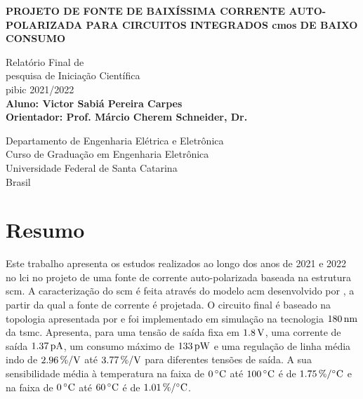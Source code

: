 \documentclass[10pt,a4paper]{extreport}
\newcommand{\?}{\stackrel{?}{=}}
\newcommand{\sis}[2]{\complexnum{#1}\,\si[per-mode=symbol]{#2}}
\newcommand\myemptypage{
    \null
    \thispagestyle{empty}
    \addtocounter{page}{-1}
    \newpage
    }
\begin{document}
\begingroup
\renewcommand{\thepage}{0}
\begin{titlepage}
    \begin{center}
        \vspace*{1cm}
        \Huge
        \textbf{PROJETO DE FONTE DE BAIXÍSSIMA CORRENTE AUTO-POLARIZADA PARA CIRCUITOS INTEGRADOS \acrshort{cmos} DE BAIXO CONSUMO}
             
        \vspace{1.5cm}

        Relatório Final de \\
        pesquisa de Iniciação Científica\\
        \acrshort{pibic} 2021/2022\\
 
        \vfill
        \Large
        \textbf{Aluno: Victor Sabiá Pereira Carpes}\\
        \textbf{Orientador: Prof. Márcio Cherem Schneider, Dr.}
        \vspace{0.8cm}

        Departamento de Engenharia Elétrica e Eletrônica\\
        Curso de Graduação em Engenharia Eletrônica\\
        Universidade Federal de Santa Catarina\\
        Brasil\\
        
             
    \end{center}
\end{titlepage}
\endgroup
\myemptypage
\Large

\setcounter{lofdepth}{2}
\tableofcontents

\chapter*{Resumo}
\label{ch:resumo}

Este trabalho apresenta os estudos realizados ao longo dos anos de 2021 e 2022 no \acrfull{lci} no projeto de uma fonte de corrente auto-polarizada baseada na estrutura \acrfull{scm}. A caracterização do \acrshort{scm} é feita através do modelo \acrfull{acm} desenvolvido por \cite{acm:book}, a partir da qual a fonte de corrente é projetada. O circuito final é baseado na topologia apresentada por \cite{sbcs} e foi implementado em simulação na tecnologia $\sis{180}{\nano\meter}$ da \acrshort{tsmc}. Apresenta, para uma tensão de saída fixa em $\sis{1.8}{\volt}$, uma corrente de saída $\sis{1.37}{\pico\ampere}$, um consumo máximo de $\sis{133}{\pico\watt}$ e uma regulação de linha média indo de $\sis{2.96}{\percent\per\volt}$ até $\sis{3.77}{\percent\per\volt}$ para diferentes tensões de saída. A sua sensibilidade média à temperatura na faixa de $\sis{0}{\celsius}$ até $\sis{100}{\celsius}$ é de $\sis{1.75}{\percent\per\celsius}$ e na faixa de $\sis{0}{\celsius}$ até $\sis{60}{\celsius}$ é de $\sis{1.01}{\percent\per\celsius}$.
\vspace{2cm}
\end{document}

